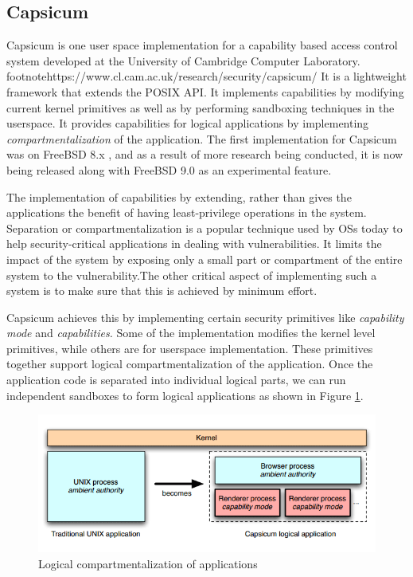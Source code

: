 \subsection{Capsicum}
\label{subsec:capsicum}

Capsicum is one user space implementation for a capability based access control system developed at the University of Cambridge Computer Laboratory. footnote{https://www.cl.cam.ac.uk/research/security/capsicum/} It is a lightweight framework that extends the POSIX API. It implements capabilities by modifying current kernel primitives as well as by performing sandboxing techniques in the userspace. It provides capabilities for logical applications by implementing \textit{compartmentalization} of the application. The first implementation for Capsicum was on FreeBSD 8.x \cite{watson2010capsicum}, and as a result of more research being conducted, it is now being released along with FreeBSD 9.0 as an experimental feature.

The implementation of capabilities by extending, rather than gives the applications the benefit of having least-privilege operations in the system. Separation or compartmentalization is a popular technique used by OSs today to help security-critical applications in dealing with vulnerabilities. It limits the impact of the system by exposing only a small part or compartment of the entire system to the vulnerability.The other critical aspect of implementing such a system is to make sure that this is achieved by minimum effort.

Capsicum achieves this by implementing certain security primitives like \textit{capability mode} and \textit{capabilities.} Some of the implementation modifies the kernel level primitives, while others are for userspace implementation. These primitives together support logical compartmentalization of the application. Once the application code is separated into individual logical parts, we can run independent sandboxes to form logical applications as shown in Figure \ref{compartment}.

\begin{figure}[t]
\centering
\includegraphics[scale=0.39]{img/capcisum_sandbox}
\caption{Logical compartmentalization of applications}
\label{compartment}
\end{figure}

